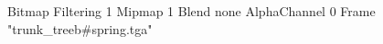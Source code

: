 {Bitmap
	{Filtering 1}
	{Mipmap 1}
	{Blend none}
	{AlphaChannel 0}
	{Frame "trunk_treeb#spring.tga"}
}
